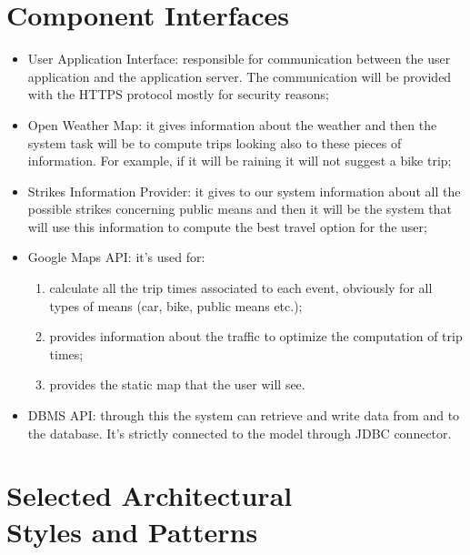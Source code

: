 \section{Component Interfaces}
\begin{itemize}
\item	User Application Interface: responsible for communication between the user application and the application server. The communication will be provided with the HTTPS protocol mostly for security reasons;
\item	Open Weather Map: it gives information about the weather and then the system task will be to compute trips looking also to these pieces of information. For example, if it will be raining it will not suggest a bike trip;
\item	Strikes Information Provider: it gives to our system information about all the possible strikes concerning public means and then it will be the system that will use this information to compute the best travel option for the user;
\item	Google Maps API: it’s used for:
\begin{enumerate}
\item	calculate all the trip times associated to each event, obviously for all types of means (car, bike, public means etc.);
\item	provides information about the traffic to optimize the computation of trip times;
\item	provides the static map that the user will see.
\end{enumerate}
\item	DBMS API: through this the system can retrieve and write data from and to the database. It’s strictly connected to the model through JDBC connector.
\end{itemize}
%
%
\section{Selected Architectural \\Styles and Patterns}

